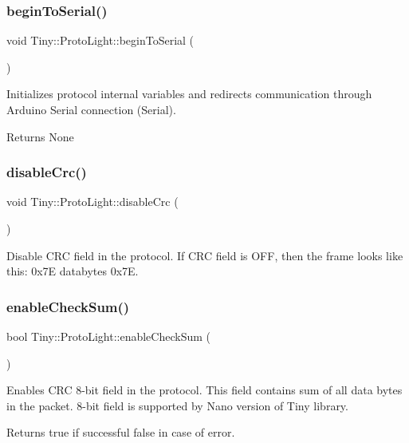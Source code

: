 \subsubsection{\texorpdfstring{begin\+To\+Serial()}{beginToSerial()}}
{\footnotesize\ttfamily void Tiny\+::\+Proto\+Light\+::begin\+To\+Serial (\begin{DoxyParamCaption}{ }\end{DoxyParamCaption})}

Initializes protocol internal variables and redirects communication through Arduino Serial connection (Serial). \begin{DoxyReturn}{Returns}
None 
\end{DoxyReturn}
\mbox{\label{classTiny_1_1ProtoLight_af93e0591ca33137ad79ffb054953001c}} 
\subsubsection{\texorpdfstring{disable\+Crc()}{disableCrc()}}
{\footnotesize\ttfamily void Tiny\+::\+Proto\+Light\+::disable\+Crc (\begin{DoxyParamCaption}{ }\end{DoxyParamCaption})}

Disable C\+RC field in the protocol. If C\+RC field is O\+FF, then the frame looks like this\+: 0x7E databytes 0x7E. \mbox{\label{classTiny_1_1ProtoLight_ad7b4ef5a43c187f0d1915efe7450bc40}} 
\subsubsection{\texorpdfstring{enable\+Check\+Sum()}{enableCheckSum()}}
{\footnotesize\ttfamily bool Tiny\+::\+Proto\+Light\+::enable\+Check\+Sum (\begin{DoxyParamCaption}{ }\end{DoxyParamCaption})}

Enables C\+RC 8-\/bit field in the protocol. This field contains sum of all data bytes in the packet. 8-\/bit field is supported by Nano version of Tiny library. \begin{DoxyReturn}{Returns}
true if successful false in case of error. 
\end{DoxyReturn}
\mbox{\label{classTiny_1_1ProtoLight_a110b654e476691518790edcc5bf1bd80}} 
